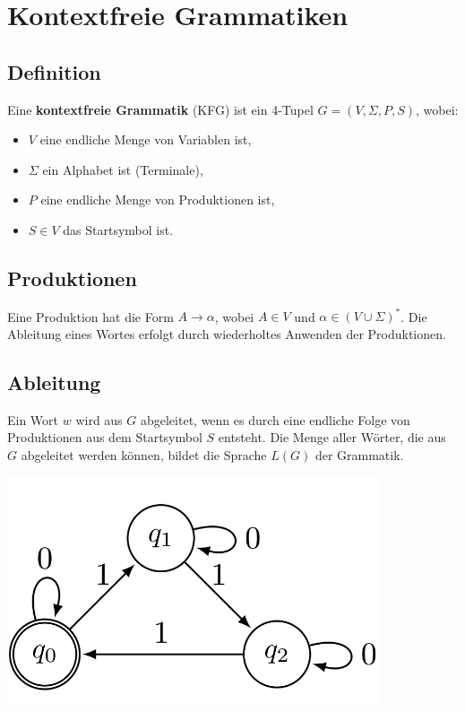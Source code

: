 \documentclass{article}
\begin{document}
\vspace{0.5cm}

\section*{Kontextfreie Grammatiken}
\begin{minipage}[t]{0.45\textwidth}
    \subsection*{Definition}
    Eine \textbf{kontextfreie Grammatik} (KFG) ist ein 4-Tupel $G = (V, \Sigma, P, S)$, wobei:
    \begin{itemize}
        \item $V$ eine endliche Menge von Variablen ist,
        \item $\Sigma$ ein Alphabet ist (Terminale),
        \item $P$ eine endliche Menge von Produktionen ist,
        \item $S \in V$ das Startsymbol ist.
    \end{itemize}
    \subsection*{Produktionen}
    Eine Produktion hat die Form $A \to \alpha$, wobei $A \in V$ und $\alpha \in (V \cup \Sigma)^*$. Die Ableitung eines Wortes erfolgt durch wiederholtes Anwenden der Produktionen.
\end{minipage}
\hfill
\begin{minipage}[t]{0.45\textwidth}
    \subsection*{Ableitung}
    Ein Wort $w$ wird aus $G$ abgeleitet, wenn es durch eine endliche Folge von Produktionen aus dem Startsymbol $S$ entsteht. Die Menge aller Wörter, die aus $G$ abgeleitet werden können, bildet die Sprache $L(G)$ der Grammatik.
    \begin{center}
        \includegraphics[scale=0.5]{images/kfg.png}
    \end{center}
\end{minipage}
\end{document}
